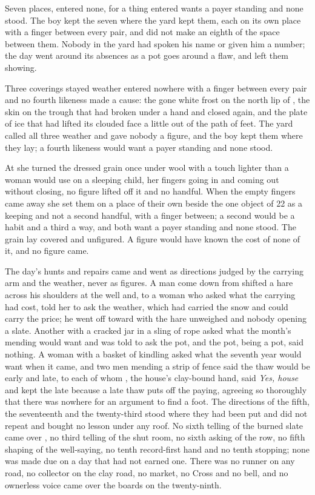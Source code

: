 Seven places, entered none, for a thing entered wants a payer standing and none stood. The boy kept the seven where the yard kept them, each on its own place with a finger between every pair, and did not make an eighth of the space between them. Nobody in the yard had spoken his name or given him a number; the day went around its absences as a pot goes around a flaw, and left them showing.

\scenebreak

Three coverings stayed weather entered nowhere with a finger between every pair and no fourth likeness made a cause: the gone white frost on the north lip of , the skin on the trough that had broken under a hand and closed again, and the plate of ice that had lifted its clouded face a little out of the path of feet. The yard called all three weather and gave nobody a figure, and the boy kept them where they lay; a fourth likeness would want a payer standing and none stood.

At  she turned the dressed grain once under wool with a touch lighter than a woman would use on a sleeping child, her fingers going in and coming out without closing, no figure lifted off it and no handful. When the empty fingers came away she set them on a place of their own beside the one object of  22 as a keeping and not a second handful, with a finger between; a second would be a habit and a third a way, and both want a payer standing and none stood. The grain lay covered and unfigured. A figure would have known the cost of none of it, and no figure came.

The day's hunts and repairs came and went as directions judged by the carrying arm and the weather, never as figures. A man come down from  shifted a hare across his shoulders at the well and, to a woman who asked what the carrying had cost, told her to ask the weather, which had carried the snow and could carry the price; he went off toward  with the hare unweighed and nobody opening a slate. Another with a cracked jar in a sling of rope asked what the month's mending would want and was told to ask the pot, and the pot, being a pot, said nothing. A woman with a basket of kindling asked what the seventh year would want when it came, and two men mending a strip of fence said the thaw would be early and late, to each of whom , the house's clay-bound hand, said \emph{Yes, house} and kept the late because a late thaw puts off the paying, agreeing so thoroughly that there was nowhere for an argument to find a foot. The directions of the fifth, the seventeenth and the twenty-third stood where they had been put and did not repeat and bought no lesson under any roof. No sixth telling of the burned slate came over , no third telling of the shut room, no sixth asking of the row, no fifth shaping of the well-saying, no tenth record-first hand and no tenth stopping; none was made due on a day that had not earned one. There was no runner on any road, no collector on the clay road, no market, no Cross and no bell, and no ownerless voice came over the boards on the twenty-ninth.

